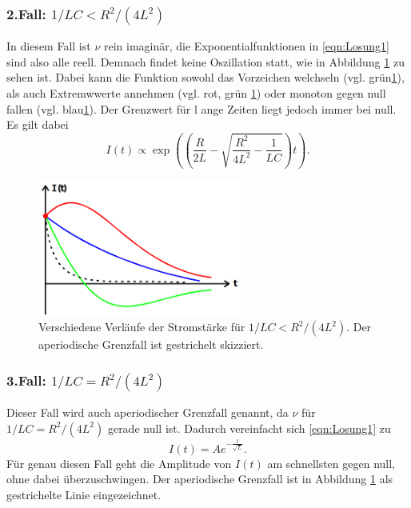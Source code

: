 \subsubsection*{2.Fall: $1/LC<R^2/(4L^2)$}
In diesem Fall ist $\nu$ rein imaginär, die Exponentialfunktionen in \eqref{eqn:Losung1} sind also alle reell. Demnach findet keine Oszillation
statt, wie in Abbildung \ref{fig:Fall2} zu sehen ist. Dabei kann die Funktion sowohl das Vorzeichen welchseln (vgl. grün\ref{fig:Fall2}), als
auch Extremwwerte annehmen (vgl. rot, grün \ref{fig:Fall2}) oder monoton gegen null fallen (vgl. blau\ref{fig:Fall2}). Der Grenzwert für l
ange Zeiten liegt jedoch immer bei null. Es gilt dabei
\begin{equation*}
    I(t)\propto \exp\left(\left(\frac{R}{2L}-\sqrt{\frac{R^2}{4L^2}-\frac{1}{LC}}\right)t\right)    .
\end{equation*}
\begin{figure}[H]
    \centering
    \includegraphics[width=0.6\textwidth]{pictures/Fall2.png}
    \caption{Verschiedene Verläufe der Stromstärke für $1/LC<R^2/(4L^2)$. Der aperiodische Grenzfall ist gestrichelt skizziert.\cite{AP01}}
    \label{fig:Fall2}
\end{figure}

\subsubsection*{3.Fall: $1/LC=R^2/(4L^2)$}
\label{sec:Fall3}
Dieser Fall wird auch aperiodischer Grenzfall genannt, da $\nu$ für $1/LC=R^2/(4L^2)$ gerade null ist. Dadurch vereinfacht sich \eqref{eqn:Losung1}
zu 
\begin{equation*}
    I(t)=Ae^{-\frac{t}{\sqrt{L}}}   .
\end{equation*}
Für genau diesen Fall geht die Amplitude von $I(t)$ am schnellsten gegen null, ohne dabei überzuschwingen. Der aperiodische Grenzfall ist in 
Abbildung \ref{fig:Fall2} als gestrichelte Linie eingezeichnet. 

